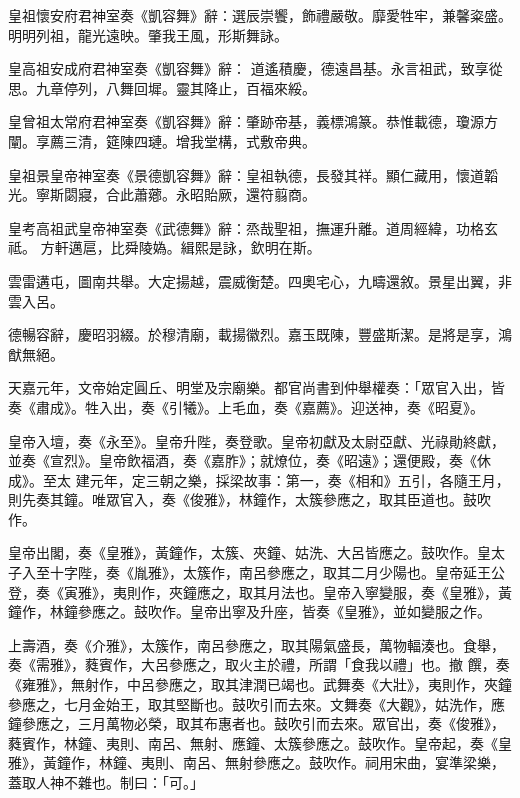 \begin{pinyinscope}
 皇祖懷安府君神室奏《凱容舞》辭：選辰崇饗，飾禮嚴敬。靡愛牲牢，兼馨粢盛。明明列祖，龍光遠映。肇我王風，形斯舞詠。



 皇高祖安成府君神室奏《凱容舞》辭：
 道遙積慶，德遠昌基。永言祖武，致享從思。九章停列，八舞回墀。靈其降止，百福來綏。



 皇曾祖太常府君神室奏《凱容舞》辭：肇跡帝基，義標鴻篆。恭惟載德，瓊源方闡。享薦三清，筵陳四璉。增我堂構，式敷帝典。



 皇祖景皇帝神室奏《景德凱容舞》辭：皇祖執德，長發其祥。顯仁藏用，懷道韜光。寧斯閟寢，合此蕭薌。永昭貽厥，還符翦商。



 皇考高祖武皇帝神室奏《武德舞》辭：烝哉聖祖，撫運升離。道周經緯，功格玄祗。
 方軒邁扈，比舜陵媯。緝熙是詠，欽明在斯。



 雲雷遘屯，圖南共舉。大定揚越，震威衡楚。四奧宅心，九疇還敘。景星出翼，非雲入呂。



 德暢容辭，慶昭羽綴。於穆清廟，載揚徽烈。嘉玉既陳，豐盛斯潔。是將是享，鴻猷無絕。



 天嘉元年，文帝始定圓丘、明堂及宗廟樂。都官尚書到仲舉權奏：「眾官入出，皆奏《肅成》。牲入出，奏《引犧》。上毛血，奏《嘉薦》。迎送神，奏《昭夏》。



 皇帝入壇，奏《永至》。皇帝升陛，奏登歌。皇帝初獻及太尉亞獻、光祿勛終獻，並奏《宣烈》。皇帝飲福酒，奏《嘉胙》；就燎位，奏《昭遠》；還便殿，奏《休成》。至太
 建元年，定三朝之樂，採梁故事：第一，奏《相和》五引，各隨王月，則先奏其鐘。唯眾官入，奏《俊雅》，林鐘作，太簇參應之，取其臣道也。鼓吹作。



 皇帝出閣，奏《皇雅》，黃鐘作，太簇、夾鐘、姑洗、大呂皆應之。鼓吹作。皇太子入至十字陛，奏《胤雅》，太簇作，南呂參應之，取其二月少陽也。皇帝延王公登，奏《寅雅》，夷則作，夾鐘應之，取其月法也。皇帝入寧變服，奏《皇雅》，黃鐘作，林鐘參應之。鼓吹作。皇帝出寧及升座，皆奏《皇雅》，並如變服之作。



 上壽酒，奏《介雅》，太簇作，南呂參應之，取其陽氣盛長，萬物輻湊也。食舉，奏《需雅》，蕤賓作，大呂參應之，取火主於禮，所謂「食我以禮」也。撤
 饌，奏《雍雅》，無射作，中呂參應之，取其津潤已竭也。武舞奏《大壯》，夷則作，夾鐘參應之，七月金始王，取其堅斷也。鼓吹引而去來。文舞奏《大觀》，姑洗作，應鐘參應之，三月萬物必榮，取其布惠者也。鼓吹引而去來。眾官出，奏《俊雅》，蕤賓作，林鐘、夷則、南呂、無射、應鐘、太簇參應之。鼓吹作。皇帝起，奏《皇雅》，黃鐘作，林鐘、夷則、南呂、無射參應之。鼓吹作。祠用宋曲，宴準梁樂，蓋取人神不雜也。制曰：「可。」




\end{pinyinscope}
